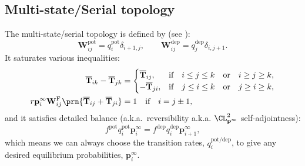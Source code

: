\documentclass{article} %
\newcommand{\pr}{\mathbf{p}}
\newcommand{\eq}{\pr^\infty}
\newcommand{\fpt}{\mathbf{T}}
\newcommand{\fptb}{\overline{\fpt}}
\newcommand{\W}{\mathbf{W}}
\newcommand{\frg}{\W^{\mathrm{F}}}
\newcommand{\pot}{^{\text{pot}}}
\newcommand{\dep}{^{\text{dep}}}
\newcommand{\potdep}{^{\text{pot/dep}}}
\begin{document}
\subsection{Multi-state/Serial topology}\label{sec:multistate}

The multi-state/serial topology is defined by (see \cite{amit1994learning,Fusi2007multistate,Leibold2008serial}):
%
\begin{equation}\label{eq:multistatedef}
  \W\pot _{ij} = q\pot _i \delta_{i+1,j},
  \qquad
  \W\dep _{ij} = q\dep _j \delta_{i,j+1}.
\end{equation}
%
It saturates various inequalities:
%
\begin{equation}\label{eq:multistateineq}
  \begin{aligned}
    \fptb_{ik} - \fptb_{jk} &=
      \begin{cases}
        \fptb_{ij},  &\text{if}\quad i \leq j \leq k \quad\text{or}\quad i \geq j \geq k,\\
        -\fptb_{ji}, &\text{if}\quad j \leq i \leq k \quad\text{or}\quad j \geq i \geq k,\\
      \end{cases} \\
    r\eq_i \frg_{ij} \prn{\fptb_{ij}+\fptb_{ji}} &= 1 \quad\text{if}\quad i=j\pm1,
  \end{aligned}
\end{equation}
%
and it satisfies detailed balance (a.k.a.\ reversibility a.k.a. $\CL^2_{\eq}$ self-adjointness):
%
\begin{equation}\label{eq:multistateprob}
  f\pot  q\pot _i \eq_i = f\dep  q\dep _i \eq_{i+1},
\end{equation}
%
which means we can always choose the transition rates, $q\potdep _i$, to give any desired equilibrium probabilities, $\eq_i$.
\end{document}
